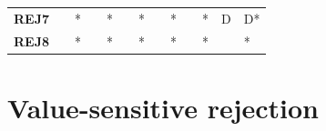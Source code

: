 \begin{table}
\begin{tabularx}{\textwidth}{ c YYYYYYYYYYYY}
        \textbf{REJ7} &                                  & *                                    &                                        & *                                        &                                       & *                                      &             & *          &             & *          & D           & D*         \\
        \textbf{REJ8} &                                  & *                                    &                                        & *                                        &                                       & *                                      &             & *          &             & *          &             & *          \\
        \bottomrule
    \end{tabularx}
\end{table}

\section{Value-sensitive rejection}
\label{sec:results-rejector}
